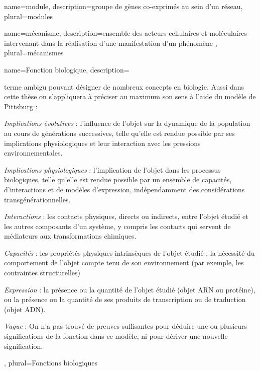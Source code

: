 
\printglossary[nonumberlist]
\glsaddall


{
	name={module},
	description={groupe de gènes co-exprimés au sein d'un réseau}, 
	plural={modules}
}

{
	name={m\'{e}canisme},
	description={ensemble des acteurs cellulaires et moléculaires intervenant dans la réalisation d'une manifestation d'un phénomène \cite{Bechtel2013}}, 
	plural={m\'{e}canismes}
}

{
	name={Fonction biologique},
	description={terme ambigu pouvant désigner de nombreux concepts en biologie. Aussi dans cette thèse on s'appliquera à préciser au maximum son sens à l'aide du modèle de Pittsburg \cite{Keeling2019Nov}:
	\begin{description}
	    \item \textit{Implications évolutives} : l'influence de l'objet sur la dynamique de la population au cours de générations successives, telle qu'elle est rendue possible par ses implications physiologiques et leur interaction avec les pressions environnementales.
	    \item \textit{Implications physiologiques} : l'implication de l'objet dans les processus biologiques, telle qu'elle est rendue possible par un ensemble de capacités, d'interactions et de modèles d'expression, indépendamment des considérations transgénérationnelles.
	    \item \textit{Interactions} : les contacts physiques, directs ou indirects, entre l'objet étudié et les autres composants d'un système, y compris les contacts qui servent de médiateurs aux transformations chimiques.
	    \item \textit{Capacités} : les propriétés physiques intrinsèques de l'objet étudié ; la nécessité du comportement de l'objet compte tenu de son environnement (par exemple, les contraintes structurelles)
	    \item \textit{Expression} : la présence ou la quantité de l'objet étudié (objet ARN ou protéine), ou la présence ou la quantité de ses produits de transcription ou de traduction (objet ADN).
	    \item \textit{Vague} : On n'a pas trouvé de preuves suffisantes pour déduire une ou plusieurs significations de la fonction dans ce modèle, ni pour dériver une nouvelle signification.
	\end{description}
	}, 
	plural={Fonctions biologiques}
}


